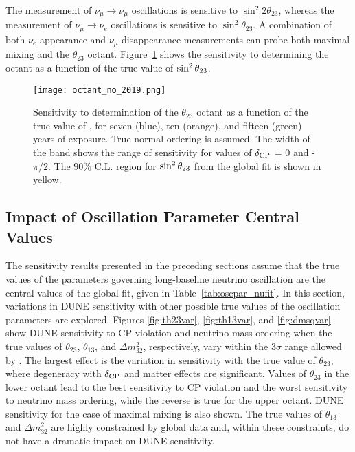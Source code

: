 The measurement of $\nu_\mu \rightarrow \nu_\mu$ oscillations is sensitive to $\sin ^2 2 \theta_{23}$, whereas the measurement of $\nu_\mu \rightarrow \nu_e$ oscillations is sensitive to $\sin^2 \theta_{23}$.  A combination of both $\nu_e$ appearance and $\nu_\mu$ disappearance measurements can probe both maximal mixing and
the $\theta_{23}$ octant.  
Figure~\ref{fig:lbloctant} shows the sensitivity to determining the octant as a function of the true value of $\sin^2\theta_{23}$.

\begin{figure}[h!]
    \centering
		\texttt{[image: octant\_no\_2019.png]}
	\caption[Sensitivity of determination of the $\theta_{23}$ octant as a function of ]{Sensitivity to determination of the $\theta_{23}$ octant as a function of the true value of , for seven (blue), ten (orange), and fifteen (green) years of exposure. True normal ordering is assumed. The width of the band shows the range of sensitivity for values of $\delta_{\rm CP}$ = 0 and -$\pi/2$. The 90\% C.L. region for $\sin^2\theta_{23}$ from the  global fit is shown in yellow.}
    \label{fig:lbloctant}
\end{figure}

\subsection{Impact of Oscillation Parameter Central Values}
\label{sec:physics-lbnosc-oscvar}
The sensitivity results presented in the preceding sections assume that the true values of the parameters governing long-baseline neutrino oscillation are the central values of the  global fit, given in Table~\ref{tab:oscpar_nufit}. In this section, variations in DUNE sensitivity with other possible true values of the oscillation parameters are explored.
Figures \ref{fig:th23var}, \ref{fig:th13var}, and \ref{fig:dmsqvar} show DUNE sensitivity to CP violation and neutrino mass ordering when the true values of $\theta_{23}$, $\theta_{13}$, and $\Delta m^{2}_{32}$, respectively, vary within the 3$\sigma$ range allowed by . The largest effect is the variation in sensitivity with the true value of $\theta_{23}$, where degeneracy with $\delta_{\rm CP}$ and matter effects are significant. Values of $\theta_{23}$ in the lower octant lead to the best sensitivity to CP violation and the worst sensitivity to neutrino mass ordering, while the reverse is true for the upper octant. DUNE sensitivity for the case of maximal mixing is also shown. The true values of $\theta_{13}$ and $\Delta m^2_{32}$ are highly constrained by global data and, within these constraints, do not have a dramatic impact on DUNE sensitivity.  

